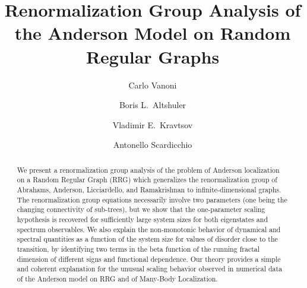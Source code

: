 \documentclass[reprint,aps,prl,superscriptaddress,english,nolongbibliography]{revtex4-1}
\begin{document}
\title{Renormalization Group Analysis of the Anderson Model on Random Regular Graphs}

\author{Carlo Vanoni}
\author{Boris L.\ Altshuler}
\author{Vladimir E.\ Kravtsov}
\author{Antonello Scardicchio}

\begin{abstract}
    We present a renormalization group analysis of the problem of Anderson localization on a Random Regular Graph (RRG) which generalizes the renormalization group of Abrahams, Anderson, Licciardello, and Ramakrishnan to infinite-dimensional graphs. The renormalization group equations necessarily involve two parameters (one being the changing connectivity of sub-trees), but we show that the one-parameter scaling hypothesis is recovered for sufficiently large system sizes for both eigenstates and spectrum observables. 
    We also explain the non-monotonic behavior of dynamical and spectral quantities as a function of the system size for values of disorder close to the transition, by identifying two terms in the beta function of the running fractal dimension of different signs and functional dependence. Our theory provides a simple and coherent explanation for the unusual scaling behavior observed in numerical data of the Anderson model on RRG and of Many-Body Localization.
\end{abstract}

\maketitle
\end{document}
